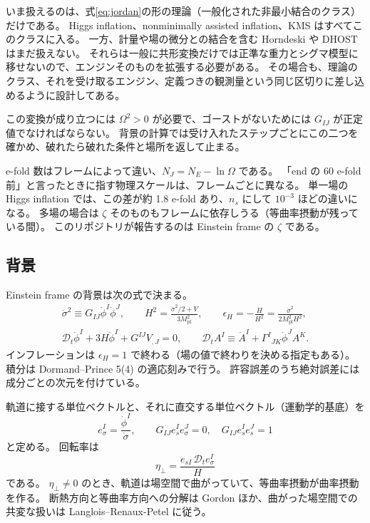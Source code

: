 \documentclass[a4paper,11pt]{ltjsarticle}
\newcommand{\Mpl}{M_{\mathrm{pl}}}
\newcommand{\Dt}{\mathcal{D}_t}
\begin{document}
いま扱えるのは、式\eqref{eq:jordan}の形の理論（一般化された非最小結合のクラス）だけである。
Higgs inflation、nonminimally assisted inflation、KMS はすべてこのクラスに入る。
一方、計量や場の微分との結合を含む Horndeski や DHOST\cite{ZGB2014,LangloisNoui2016,BLN2016} はまだ扱えない。
それらは一般に共形変換だけでは正準な重力とシグマ模型に移せないので、エンジンそのものを拡張する必要がある。
その場合も、理論のクラス、それを受け取るエンジン、定義つきの観測量という同じ区切りに差し込めるように設計してある。

この変換が成り立つには $\Omega^2>0$ が必要で、ゴーストがないためには $G_{IJ}$ が正定値でなければならない。
背景の計算では受け入れたステップごとにこの二つを確かめ、破れたら破れた条件と場所を返して止まる。

e-fold 数はフレームによって違い、$N_J=N_E-\ln\Omega$ である。
「end の 60 e-fold 前」と言ったときに指す物理スケールは、フレームごとに異なる。
単一場の Higgs inflation\cite{BezrukovShaposhnikov2008} では、この差が約 1.8 e-fold あり、$n_s$ にして $10^{-3}$ ほどの違いになる。
多場の場合は $\zeta$ そのものもフレームに依存しうる（等曲率摂動が残っている間）\cite{WMS2012}。
このリポジトリが報告するのは Einstein frame の $\zeta$ である。

\subsection{背景}

Einstein frame の背景は次の式で決まる。
\begin{gather}
\dot\sigma^2\equiv G_{IJ}\dot\phi^I\dot\phi^J,\qquad
H^2=\frac{\dot\sigma^2/2+V}{3\Mpl^2},\qquad
\epsilon_H=-\frac{\dot H}{H^2}=\frac{\dot\sigma^2}{2\Mpl^2H^2},\\
\Dt\dot\phi^I+3H\dot\phi^I+G^{IJ}V_{,J}=0,\qquad
\Dt A^I\equiv\dot A^I+\Gamma^I{}_{JK}\dot\phi^JA^K .
\end{gather}
インフレーションは $\epsilon_H=1$ で終わる（場の値で終わりを決める指定もある）。
積分は Dormand--Prince 5(4) の適応刻みで行う。
許容誤差のうち絶対誤差には成分ごとの次元を付けている。

軌道に接する単位ベクトルと、それに直交する単位ベクトル（運動学的基底）を
\[
e_\sigma^I=\frac{\dot\phi^I}{\dot\sigma},\qquad G_{IJ}e_s^Ie_\sigma^J=0,\quad G_{IJ}e_s^Ie_s^J=1
\]
と定める。
回転率は
\[
\eta_\perp=\frac{e_{sI}\,\Dt e_\sigma^I}{H}
\]
である。
$\eta_\perp\neq0$ のとき、軌道は場空間で曲がっていて、等曲率摂動が曲率摂動を作る。
断熱方向と等曲率方向への分解は Gordon ほか\cite{Gordon2001}、曲がった場空間での共変な扱いは Langlois--Renaux-Petel\cite{LRP2008} に従う。
\end{document}
